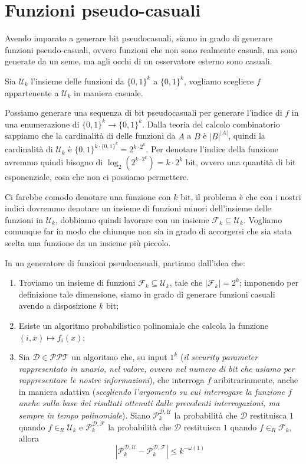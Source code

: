\section{Funzioni pseudo-casuali}
Avendo imparato a generare bit pseudocasuali, siamo in grado di generare funzioni pseudo-casuali,
ovvero funzioni che non sono realmente casuali, ma sono generate da un seme, ma agli occhi 
di un osservatore esterno sono casuali.

Sia $\mathcal{U}_k$ l'insieme delle funzioni da $\{0,1\}^k$ a $\{0,1\}^k$, 
vogliamo scegliere $f$ appartenente a $\mathcal{U}_k$ in maniera casuale.

Possiamo generare una sequenza di bit pseudocasuali per generare l'indice di $f$ in 
una enumerazione di $\{0,1\}^k \to \{0,1\}^k$. Dalla teoria del calcolo combinatorio sappiamo
che la cardinalità di delle funzioni da $A$ a $B$ è $|B|^{|A|}$, quindi la cardinalità
di $\mathcal{U}_k$ è $\{0,1\}^{k\cdot \{0,1\}^k} = 2^{k\cdot 2^k}$.
Per denotare l'indice della funzione avremmo quindi bisogno di $\log_2(2^{k\cdot 2^k}) = k\cdot 2^k$ bit,
ovvero una quantità di bit esponenziale, cosa che non ci possiamo permettere.

Ci farebbe comodo denotare una funzione con $k$ bit, il problema è che con i nostri indici dovremmo 
denotare un insieme di funzioni minori dell'insieme delle funzioni in $\mathcal{U}_k$, dobbiamo 
quindi lavorare con un insieme $\mathcal{F}_k \subseteq \mathcal{U}_k$. Vogliamo comunque 
far in modo che chiunque non sia in grado di accorgersi che sia stata scelta una funzione
da un insieme più piccolo.

In un generatore di funzioni pseudocasuali, partiamo dall'idea che:
\begin{enumerate}
    \item Troviamo un insieme di funzioni
    $\mathcal{F}_k \subseteq \mathcal{U}_k$, tale che $|\mathcal{F}_k| = 2^k$; imponendo per definizione
    tale dimensione, siamo in grado di generare funzioni casuali avendo a disposizione $k$ bit;
    \item Esiste un algoritmo probabilistico polinomiale che calcola la funzione $(i,x) \mapsto f_i(x)$;
    \item Sia $\mathcal{D}\in \mathcal{PPT}$ un algoritmo che, su input $1^k$ (\textit{il 
    security parameter rappresentato in unario, nel valore, ovvero nel numero di bit che
    usiamo per rappresentare le nostre informazioni}), che interroga $f$ aribitrariamente,
    anche in maniera adattiva (\textit{scegliendo l'argomento su cui interrogare la funzione 
    $f$ anche sulla base dei risultati ottenuti dalle precedenti interrogazioni, ma sempre in 
    tempo polinomiale}). Siano $\mathcal{P}_k^{\mathcal{D}, \mathcal{U}}$ la probabilità che 
    $\mathcal{D}$ restituisca $1$ quando $f\in_R \mathcal{U}_k$ e $\mathcal{P}_k^{\mathcal{D}, \mathcal{F}}$
    la probabilità che $\mathcal{D}$ restituisca $1$ quando $f\in_R \mathcal{F}_k$, allora 
    \[
        \left| \mathcal{P}_k^{\mathcal{D}, \mathcal{U}} - \mathcal{P}_k^{\mathcal{D}, \mathcal{F}} \right| \leq k^{-\omega(1)}
    \]
\end{enumerate}
